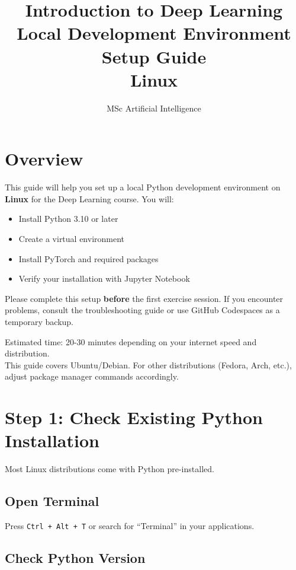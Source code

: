 \documentclass[11pt,a4paper]{article}
\title{Introduction to Deep Learning\\
Local Development Environment Setup Guide\\
\textbf{Linux}}
\author{MSc Artificial Intelligence}
\date{}
\begin{document}
\maketitle

\tableofcontents
\newpage

\section{Overview}

This guide will help you set up a local Python development environment on \textbf{Linux} for the Deep Learning course. You will:
\begin{itemize}
    \item Install Python 3.10 or later
    \item Create a virtual environment
    \item Install PyTorch and required packages
    \item Verify your installation with Jupyter Notebook
\end{itemize}

\begin{warningbox}
Please complete this setup \textbf{before} the first exercise session. If you encounter problems, consult the troubleshooting guide or use GitHub Codespaces as a temporary backup.
\end{warningbox}

\begin{infobox}
Estimated time: 20-30 minutes depending on your internet speed and distribution.\\
This guide covers Ubuntu/Debian. For other distributions (Fedora, Arch, etc.), adjust package manager commands accordingly.
\end{infobox}

\section{Step 1: Check Existing Python Installation}

Most Linux distributions come with Python pre-installed.

\subsection{Open Terminal}

Press \texttt{Ctrl + Alt + T} or search for ``Terminal'' in your applications.

\subsection{Check Python Version}
\end{document}
